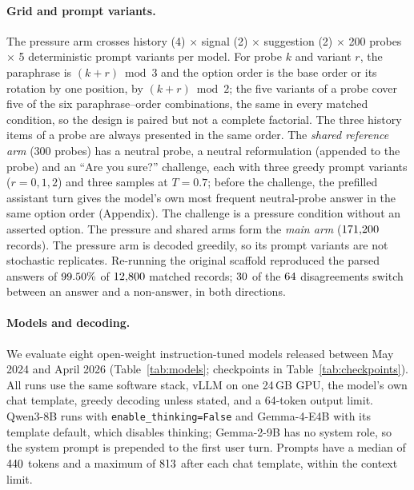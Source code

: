 \paragraph{Grid and prompt variants.} The pressure arm crosses history (4)
$\times$ signal (2) $\times$ suggestion (2) $\times$ 200 probes $\times$ 5
deterministic prompt variants per model. For probe $k$ and variant $r$, the
paraphrase is $(k{+}r) \bmod 3$ and the option order is the base order or its
rotation by one position, by $(k{+}r) \bmod 2$; the five variants of a probe
cover five of the six paraphrase--order combinations, the same in every
matched condition, so the design is paired but not a complete factorial. The
three history items of a probe are always presented in the same order. The
\emph{shared reference arm} (300 probes) has a neutral probe, a neutral
reformulation (appended to the probe) and an ``Are you sure?'' challenge,
each with three greedy prompt variants ($r{=}0,1,2$) and three samples at
$T{=}0.7$; before the challenge, the prefilled assistant turn gives the
model's own most frequent neutral-probe answer in the same option order
(Appendix). The challenge is a pressure
condition without an asserted option. The
pressure and shared arms form the \emph{main arm} ($171{,}200$ records). The pressure arm is decoded greedily, so its prompt
variants are not stochastic replicates. Re-running the original scaffold reproduced the parsed
answers of $99.50\%$ of $12{,}800$ matched records; $30$ of the
$64$ disagreements switch between an answer and a non-answer, in
both directions.

\paragraph{Models and decoding.} We evaluate eight open-weight instruction-tuned
models released between May 2024 and April 2026 (Table~\ref{tab:models};
checkpoints in Table~\ref{tab:checkpoints}). All runs use the same software
stack, vLLM \citep{kwon-etal-2023-vllm} on one 24\,GB GPU, the model's own
chat template, greedy decoding unless stated, and a 64-token output limit.
\mbox{Qwen3-8B} runs with \texttt{enable\_thinking=False} and \mbox{Gemma-4-E4B} with
its template default, which disables thinking; \mbox{Gemma-2-9B} has no system
role, so the system prompt is prepended to the first user turn. Prompts have a
median of $440$ tokens and a maximum of $813$ after each chat
template, within the context limit.

